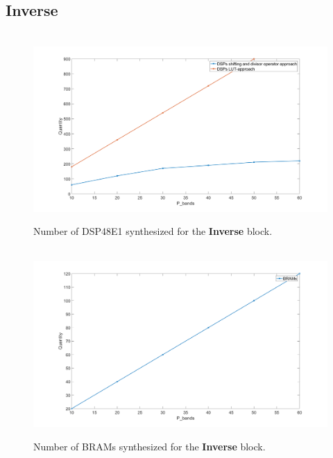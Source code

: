  

\subsection{Inverse}



\begin{figure}[H]

\hbox{\hspace*{-1cm}                                                           
   \includegraphics[scale=0.27]{images/syntese_resultat/inverse/number_of_dsps.png}}
  \caption{Number of DSP48E1 synthesized for the \textbf{Inverse} block. } 
  \label{fig:dsps_inverse}
\end{figure}


\begin{figure}[H]

\hbox{\hspace*{-1cm}                                                           
   \includegraphics[scale=0.27]{images/syntese_resultat/inverse/brams.png}}
  \caption{Number of BRAMs synthesized for the \textbf{Inverse} block. } 
  \label{fig:brams_inverse}
\end{figure}


